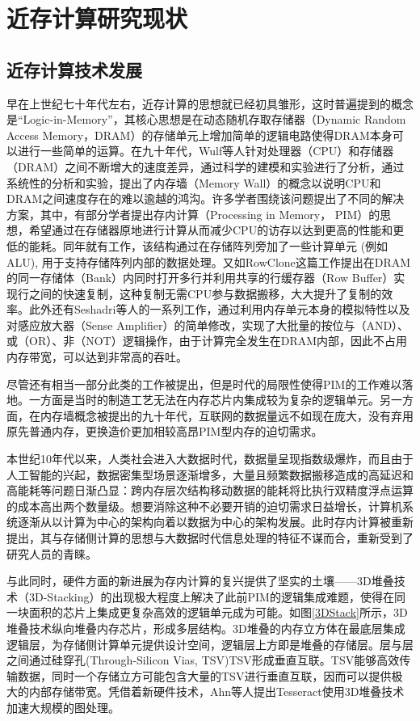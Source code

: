 \section{近存计算研究现状}

\subsection{近存计算技术发展}
早在上世纪七十年代左右，近存计算的思想就已经\cite{CellularLogicInMemory,LogicInMemory}初具雏形，这时普遍提到的概念是“Logic-in-Memory”，其核心思想是在动态随机存取存储器（Dynamic Random Access Memory，DRAM）的存储单元上增加简单的逻辑电路使得DRAM本身可以进行一些简单的运算。在九十年代，Wulf等人针对处理器（CPU）和存储器（DRAM）之间不断增大的速度差异，通过科学的建模和实验进行了分析，通过系统性的分析和实验，提出了内存墙（Memory Wall）的概念以说明CPU和DRAM之间速度存在的难以逾越的鸿沟\cite{MemoryWall}。许多学者围绕该问题提出了不同的解决方案，其中，有部分学者提出存内计算（Processing in Memory， PIM）的思想，希望通过在存储器原地进行计算从而减少CPU的访存以达到更高的性能和更低的能耗。同年就有工作\cite{MicroArchitecturePIM}，该结构通过在存储阵列旁加了一些计算单元 (例如 ALU), 用于支持存储阵列内部的数据处理。又如RowClone这篇工作\cite{RowClone}提出在DRAM的同一存储体（Bank）内同时打开多行并利用共享的行缓存器（Row Buffer）实现行之间的快速复制，这种复制无需CPU参与数据搬移，大大提升了复制的效率。此外还有Seshadri等人\cite{BitAndOr,Ambit}的一系列工作，通过利用内存单元本身的模拟特性以及对感应放大器（Sense Amplifier）的简单修改，实现了大批量的按位与（AND）、或（OR）、非（NOT）逻辑操作，由于计算完全发生在DRAM内部，因此不占用内存带宽，可以达到非常高的吞吐。

尽管还有相当一部分此类的工作被提出，但是时代的局限性使得PIM的工作难以落地。一方面是当时的制造工艺无法在内存芯片内集成较为复杂的逻辑单元。另一方面，在内存墙概念被提出的九十年代，互联网的数据量远不如现在庞大，没有弃用原先普通内存，更换造价更加相较高昂PIM型内存的迫切需求\cite{NDPWorkshop}。

本世纪10年代以来，人类社会进入大数据时代，数据量呈现指数级爆炸，而且由于人工智能的兴起，数据密集型场景逐渐增多，大量且频繁数据搬移造成的高延迟和高能耗等问题日渐凸显：跨内存层次结构移动数据的能耗将比执行双精度浮点运算的成本高出两个数量级\cite{EnergyCost}。想要消除这种不必要开销的迫切需求日益增长，计算机系统逐渐从以计算为中心的架构向着以数据为中心的架构发展。此时存内计算被重新提出，其与存储侧计算的思想与大数据时代信息处理的特征不谋而合，重新受到了研究人员的青睐。

与此同时，硬件方面的新进展为存内计算的复兴提供了坚实的土壤——3D堆叠技术（3D-Stacking）的出现极大程度上解决了此前PIM的逻辑集成难题，使得在同一块面积的芯片上集成更复杂高效的逻辑单元成为可能。如图\ref{3DStack}所示，3D堆叠技术纵向堆叠内存芯片，形成多层结构。3D堆叠的内存立方体在最底层集成逻辑层，为存储侧计算单元提供设计空间，逻辑层上方即是堆叠的存储层。层与层之间通过硅穿孔(Through-Silicon Vias, TSV)TSV形成垂直互联。TSV能够高效传输数据，同时一个存储立方可能包含大量的TSV进行垂直互联，因而可以提供极大的内部存储带宽。凭借着新硬件技术，Ahn等人\cite{Tesseract}提出Tesseract使用3D堆叠技术加速大规模的图处理。

